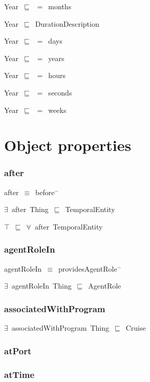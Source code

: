 \documentclass{article}
\begin{document}
Year~\ensuremath{\sqsubseteq}~\ensuremath{=}~months~

Year~\ensuremath{\sqsubseteq}~DurationDescription~

Year~\ensuremath{\sqsubseteq}~\ensuremath{=}~days~

Year~\ensuremath{\sqsubseteq}~\ensuremath{=}~years~

Year~\ensuremath{\sqsubseteq}~\ensuremath{=}~hours~

Year~\ensuremath{\sqsubseteq}~\ensuremath{=}~seconds~

Year~\ensuremath{\sqsubseteq}~\ensuremath{=}~weeks~

\section*{Object properties}\subsubsection*{after}

after~\ensuremath{\equiv}~before\ensuremath{^-}

\ensuremath{\exists}~after~Thing~\ensuremath{\sqsubseteq}~TemporalEntity

\ensuremath{\top}~\ensuremath{\sqsubseteq}~\ensuremath{\forall}~after~TemporalEntity

\subsubsection*{agentRoleIn}

agentRoleIn~\ensuremath{\equiv}~providesAgentRole\ensuremath{^-}

\ensuremath{\exists}~agentRoleIn~Thing~\ensuremath{\sqsubseteq}~AgentRole

\subsubsection*{associatedWithProgram}

\ensuremath{\exists}~associatedWithProgram~Thing~\ensuremath{\sqsubseteq}~Cruise

\subsubsection*{atPort}

\subsubsection*{atTime}
\end{document}
